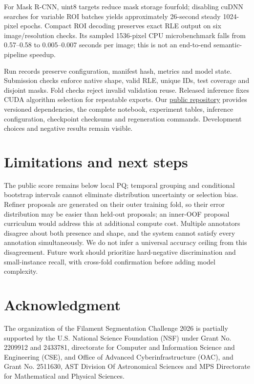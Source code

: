 \documentclass[sigconf]{acmart}
\begin{document}
For Mask R-CNN, uint8 targets reduce mask storage fourfold; disabling cuDNN searches for variable ROI batches yields approximately 26-second steady 1024-pixel epochs. Compact ROI decoding preserves exact RLE output on six image/resolution checks. Its sampled 1536-pixel CPU microbenchmark falls from 0.57--0.58 to 0.005--0.007 seconds per image; this is not an end-to-end semantic-pipeline speedup.

Run records preserve configuration, manifest hash, metrics and model state. Submission checks enforce native shape, valid RLE, unique IDs, test coverage and disjoint masks. Fold checks reject invalid validation reuse. Released inference fixes CUDA algorithm selection for repeatable exports. Our \href{https://github.com/zhang0894/Solar-Filament-Segmentation-Challenge-2026-by-Anon-Tokyo}{public repository} provides versioned dependencies, the complete notebook, experiment tables, inference configuration, checkpoint checksums and regeneration commands. Development choices and negative results remain visible.

\section{Limitations and next steps}
The public score remains below local PQ; temporal grouping and conditional bootstrap intervals cannot eliminate distribution uncertainty or selection bias. Refiner proposals are generated on their outer training fold, so their error distribution may be easier than held-out proposals; an inner-OOF proposal curriculum would address this at additional compute cost. Multiple annotators disagree about both presence and shape, and the system cannot satisfy every annotation simultaneously. We do not infer a universal accuracy ceiling from this disagreement. Future work should prioritize hard-negative discrimination and small-instance recall, with cross-fold confirmation before adding model complexity.

\section{Acknowledgment}\label{sec:acknowledgment}
The organization of the Filament Segmentation Challenge 2026 is partially supported by the U.S. National Science Foundation (NSF) under Grant No. 2209912 and 2433781, directorate for Computer and Information Science and Engineering (CSE), and Office of Advanced Cyberinfrastructure (OAC), and Grant No. 2511630, AST Division Of Astronomical Sciences and MPS Directorate for Mathematical and Physical Sciences.
\end{document}
